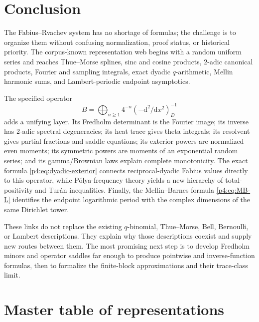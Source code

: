 \documentclass[11pt]{article}
\theoremstyle{definition}
\theoremstyle{remark}
\begin{document}
\section{Conclusion}
\label{p4:sec:conclusion}

The Fabius--Rvachev system has no shortage of formulas; the challenge is to organize
them without confusing normalization, proof status, or historical priority.  The
corpus-known representation web begins with a random uniform series and reaches
Thue--Morse splines, sinc and cosine products, 2-adic canonical products, Fourier and
sampling integrals, exact dyadic \(q\)-arithmetic, Mellin harmonic sums, and
Lambert-periodic endpoint asymptotics.

The specified operator
\[
 B=\bigoplus_{n\ge1}4^{-n}(-\mathrm d^2/\mathrm dx^2)_D^{-1}
\]
adds a unifying layer.  Its Fredholm determinant is the Fourier image; its inverse has
2-adic spectral degeneracies; its heat trace gives theta integrals; its resolvent gives
partial fractions and saddle equations; its exterior powers are normalized even
moments; its symmetric powers are moments of an exponential random series; and its
gamma/Brownian laws explain complete monotonicity.  The exact formula
\eqref{p4:eq:dyadic-exterior} connects reciprocal-dyadic Fabius values directly to this
operator, while P\'olya-frequency theory yields a new hierarchy of total-positivity and
Tur\'an inequalities.  Finally, the Mellin--Barnes formula \eqref{p4:eq:MB-L} identifies
the endpoint logarithmic period with the complex dimensions of the same Dirichlet
tower.

These links do not replace the existing \(q\)-binomial, Thue--Morse, Bell, Bernoulli,
or Lambert descriptions.  They explain why those descriptions coexist and supply new
routes between them.  The most promising next step is to develop Fredholm minors and
operator saddles far enough to produce pointwise and inverse-function formulas, then
to formalize the finite-block approximations and their trace-class limit.

\appendix

\section{Master table of representations}
\label{p4:app:atlas}
\end{document}
